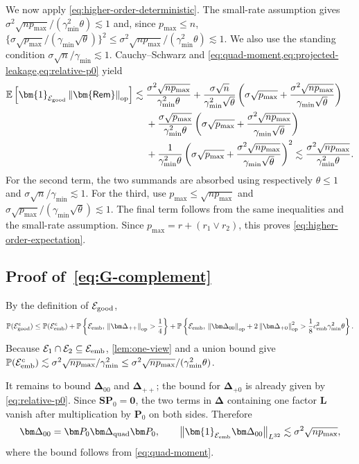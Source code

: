 \documentclass[11pt]{article}
\newcommand{\Pp}{\mathbb{P}}
\newcommand{\ind}{\bm{1}}
\newcommand{\opn}[1]{\left\lVert #1\right\rVert_{\mathrm{op}}}
\newcommand{\Lqn}[2]{\left\lVert #1\right\rVert_{L^{#2}}}
\newcommand{\cE}{\mathcal{E}}
\newcommand{\bze}{\bm{0}}
\newcommand{\gmin}{\gamma_{\min}}
\newcommand{\cemb}{c_{\mathrm{emb}}}
\begin{document}
We now apply \cref{eq:higher-order-deterministic}. The small-rate
assumption gives
$\sigma^2\sqrt{np_{\max}}/(\gmin^2\theta)\lesssim1$ and, since
$p_{\max}\le n$,
$\{\sigma\sqrt{p_{\max}}/(\gmin\sqrt\theta)\}^2
\le\sigma^2\sqrt{np_{\max}}/(\gmin^2\theta)\lesssim1$.
We also use the standing condition
$\sigma\sqrt n/\gmin\lesssim1$. Cauchy--Schwarz and
\cref{eq:quad-moment,eq:projected-leakage,eq:relative-p0} yield
\[
\begin{aligned}
  \mathbb E\left[
    \ind_{\cE_{\rm good}}\opn{\bm{\mathsf{Rem}}}
  \right]
  \lesssim{}&
  \frac{\sigma^2\sqrt{np_{\max}}}{\gmin^2\theta}
  +
  \frac{\sigma\sqrt n}{\gmin^2\sqrt\theta}
  \left(
    \sigma\sqrt{p_{\max}}
    +
    \frac{\sigma^2\sqrt{np_{\max}}}{\gmin\sqrt\theta}
  \right) \\
  &+
  \frac{\sigma\sqrt{p_{\max}}}{\gmin^2\theta}
  \left(
    \sigma\sqrt{p_{\max}}
    +
    \frac{\sigma^2\sqrt{np_{\max}}}{\gmin\sqrt\theta}
  \right) \\
  &+
  \frac{1}{\gmin^2\theta}
  \left(
    \sigma\sqrt{p_{\max}}
    +
    \frac{\sigma^2\sqrt{np_{\max}}}{\gmin\sqrt\theta}
  \right)^2
  \lesssim
  \frac{\sigma^2\sqrt{np_{\max}}}{\gmin^2\theta}.
\end{aligned}
\]
For the second term, the two summands are absorbed using respectively
$\theta\le1$ and $\sigma\sqrt n/\gmin\lesssim1$. For the third, use
$p_{\max}\le\sqrt{np_{\max}}$ and
$\sigma\sqrt{p_{\max}}/(\gmin\sqrt\theta)\lesssim1$. The final term follows
from the same inequalities and the small-rate assumption. Since
$p_{\max}=r+(r_1\vee r_2)$, this proves
\cref{eq:higher-order-expectation}.

\subsection{Proof of~\cref{eq:G-complement}}
\label{app:good-event-probability}

By the definition of $\cE_{\rm good}$,
\[
  \Pp(\cE_{\rm good}^c)
  \le
  \Pp(\cE_{\rm emb}^c)
  +
  \Pp\left\{
    \cE_{\rm emb},\,
    \opn{\bm\Delta_{++}}>\frac14
  \right\}
  +
  \Pp\left\{
    \cE_{\rm emb},\,
    \opn{\bm\Delta_{00}}
    +2\opn{\bm\Delta_{+0}}^2
    >
    \frac18\cemb^2\gmin^2\theta
  \right\}.
\]
Because $\cE_1\cap\cE_2\subseteq\cE_{\rm emb}$,
\cref{lem:one-view} and a union bound give
$\Pp(\cE_{\rm emb}^c)
\lesssim\sigma^2\sqrt{np_{\max}}/\gmin^2
\le\sigma^2\sqrt{np_{\max}}/(\gmin^2\theta)$.

It remains to bound $\bm\Delta_{00}$ and $\bm\Delta_{++}$; the bound for
$\bm\Delta_{+0}$ is already given by \cref{eq:relative-p0}. Since
$\bm S\bm P_0=\bze$, the two terms in $\bm\Delta$ containing one factor
$\bm L$ vanish after multiplication by $\bm P_0$ on both sides. Therefore
\begin{equation}
\label{eq:relative-00}
  \bm\Delta_{00}
  =
  \bm P_0\bm\Delta_{\rm quad}\bm P_0,
  \qquad
  \Lqn{
    \ind_{\cE_{\rm emb}}\bm\Delta_{00}
  }{32}
  \lesssim
  \sigma^2\sqrt{np_{\max}},
\end{equation}
where the bound follows from \cref{eq:quad-moment}.
\end{document}
